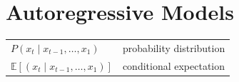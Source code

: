 \section{Autoregressive Models \cite{dnn-1}} \label{Autoregressive Models}

\begin{customTableWrapper}{1.5}
\begin{table}[H]
    \centering
    \begin{tabular}{l p{8cm}}
        $P(x_t \mid x_{t-1}, \ldots, x_1)$ & probability distribution \\
        $\mathbb{E}[(x_t \mid x_{t-1}, \ldots, x_1)]$ & conditional expectation \\
    \end{tabular}
\end{table}
\end{customTableWrapper}

